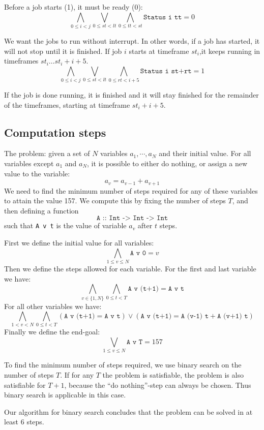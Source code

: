 \documentclass[12pt]{article}
\begin{document}
Before a job starts (1), it must be ready (0):
\[ \bigwedge_{0 \le i < j} \bigvee_{0 \le st < lt} \bigwedge_{0 \le tt < st} \texttt{Status i tt} = 0 \]

We want the jobs to run without interrupt.
In other words, if a job has started, it will not stop until it is finished. 
If job $i$ starts at timeframe $st_i$,it keeps running in timeframes $st_i \dots st_i + i + 5$.
\[ \bigwedge_{0 \le i < j} \bigvee_{0 \le st < lt} \bigwedge_{0 \le rt < i+5} \texttt{Status i st+rt} = 1 \]

If the job is done running, it is finished and it will stay finished for the remainder of the timeframes, starting at timeframe $st_i + i + 5$.


\subsection*{Computation steps}
The problem: given a set of $N$ variables $a_1, \cdots, a_N$ and their initial value.
For all variables except $a_1$ and $a_N$, it is possible to either do nothing, or assign a new value to the variable:
\[ a_v = a_{v-1} + a_{v+1} \]
We need to find the minimum number of steps required for any of these variables to attain the value 157.
We compute this by fixing the number of steps $T$, and then defining a function
\[\texttt{A :: Int -> Int -> Int}\]
such that \texttt{A v t} is the value of variable $a_v$ after $t$ steps.

First we define the initial value for all variables:
\[ \bigwedge_{1 \le v \le N} \texttt{A v 0} = v \]
Then we define the steps allowed for each variable.
For the first and last variable we have:
\[ \bigwedge_{v \in \{1, N\}} \bigwedge_{0 \le t < T} \texttt{A v (t+1)} = \texttt{A v t} \]
For all other variables we have:
\[ \bigwedge_{1 < v < N} \bigwedge_{0 \le t < T} (\texttt{A v (t+1)} = \texttt{A v t}) \vee (\texttt{A v (t+1)} = \texttt{A (v-1) t} + \texttt{A (v+1) t}) \]
Finally we define the end-goal:
\[ \bigvee_{1 \le v \le N} \texttt{A v T} = 157 \]

To find the minimum number of steps required, we use binary search on the number of steps $T$.
If for any $T$ the problem is satisfiable, the problem is also satisfiable for $T+1$, because the ``do nothing''-step can always be chosen.
Thus binary search is applicable in this case.

Our algorithm for binary search concludes that the problem can be solved in at least 6 steps.
\end{document}
